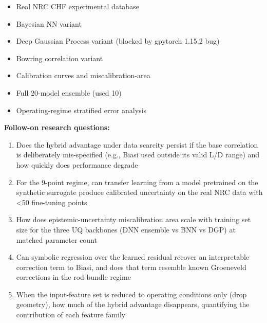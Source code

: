 \begin{itemize}[leftmargin=1.4em,itemsep=0.2em,topsep=0.2em]
\item Real NRC CHF experimental database
\item Bayesian NN variant
\item Deep Gaussian Process variant (blocked by gpytorch 1.15.2 bug)
\item Bowring correlation variant
\item Calibration curves and miscalibration-area
\item Full 20-model ensemble (used 10)
\item Operating-regime stratified error analysis
\end{itemize}\noindent\textbf{Follow-on research questions:}
\begin{enumerate}[leftmargin=1.6em,itemsep=0.2em,topsep=0.2em,label=Q\arabic*.]
\item Does the hybrid advantage under data scarcity persist if the base correlation is deliberately mis-specified (e.g., Biasi used outside its valid L/D range) and how quickly does performance degrade
\item For the 9-point regime, can transfer learning from a model pretrained on the synthetic surrogate produce calibrated uncertainty on the real NRC data with \textless{}50 fine-tuning points
\item How does epistemic-uncertainty miscalibration area scale with training set size for the three UQ backbones (DNN ensemble vs BNN vs DGP) at matched parameter count
\item Can symbolic regression over the learned residual recover an interpretable correction term to Biasi, and does that term resemble known Groeneveld corrections in the rod-bundle regime
\item When the input-feature set is reduced to operating conditions only (drop geometry), how much of the hybrid advantage disappears, quantifying the contribution of each feature family
\end{enumerate}

